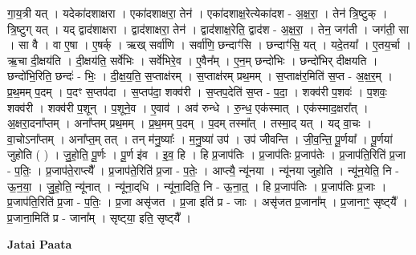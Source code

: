 \documentclass[17pt]{extarticle}
\begin{document}
गा॒य॒त्री यत् । यदेका॑दशाक्षरा । एका॑दशाक्षरा॒ तेन॑ । एका॑दशाक्ष॒रेत्येका॑दश - अ॒क्ष॒रा॒ । तेन॑ त्रि॒ष्टुक् । त्रि॒ष्टुग् यत् । यद् द्वाद॑शाक्षरा । द्वाद॑शाक्षरा॒ तेन॑ । द्वाद॑शाक्ष॒रेति॒ द्वाद॑श - अ॒क्ष॒रा॒ । तेन॒ जग॑ती । जग॑ती॒ सा । सा वै । वा ए॒षा । ए॒षर्क् । ऋख् सर्वा॑णि । सर्वा॑णि॒ छन्दाꣳ॑सि । छन्दाꣳ॑सि॒ यत् । यदे॒तया᳚ । ए॒तय॒र्चा । ऋ॒चा दी॒क्षय॑ति । दी॒क्षय॑ति॒ सर्वे॑भिः । सर्वे॑भिरे॒व । ए॒वैन᳚म् । ए॒न॒म् छन्दो॑भिः । छन्दो॑भिर् दीक्षयति । छन्दो॑भि॒रिति॒ छन्दः॑ - भिः॒ । दी॒क्ष॒य॒ति॒ स॒प्ताक्ष॑रम् । स॒प्ताक्ष॑रम् प्रथ॒मम् । स॒प्ताक्ष॑र॒मिति॑ स॒प्त - अ॒क्ष॒र॒म् । प्र॒थ॒मम् प॒दम् । प॒दꣳ स॒प्तप॑दा । स॒प्तप॑दा॒ शक्व॑री । स॒प्तप॒देति॑ स॒प्त - प॒दा॒ । शक्व॑री प॒शवः॑ । प॒शवः॒ शक्व॑री । शक्व॑री प॒शून् । प॒शूने॒व । ए॒वाव॑ । अव॑ रुन्धे । रु॒न्ध॒ एक॑स्मात् । एक॑स्माद॒क्षरा᳚त् । अ॒क्षरा॒दना᳚प्तम् । अना᳚प्तम् प्रथ॒मम् । प्र॒थ॒मम् प॒दम् । प॒दम् तस्मा᳚त् । तस्मा॒द् यत् । यद् वा॒चः । वा॒चोऽना᳚प्तम् । अना᳚प्त॒म् तत् । तन् म॑नु॒ष्याः᳚ । म॒नु॒ष्या॑ उप॑ । उप॑ जीवन्ति । जी॒व॒न्ति॒ पू॒र्णया᳚ । पू॒र्णया॑ जुहोति ( ) । जु॒हो॒ति॒ पू॒र्णः । पू॒र्ण इ॑व । इ॒व॒ हि । हि प्र॒जाप॑तिः । प्र॒जाप॑तिः प्र॒जाप॑तेः । प्र॒जाप॑ति॒रिति॑ प्र॒जा - प॒तिः॒ । प्र॒जाप॑ते॒राप्त्यै᳚ । प्र॒जाप॑ते॒रिति॑ प्र॒जा - प॒तेः॒ । आप्त्यै॒ न्यू॑नया । न्यू॑नया जुहोति । न्यू॑न॒येति॒ नि - ऊ॒न॒या॒ । जु॒हो॒ति॒ न्यू॑नात् । न्यू॑ना॒द्‌धि । न्यू॑ना॒दिति॒ नि - ऊ॒ना॒त्॒ । हि प्र॒जाप॑तिः । प्र॒जाप॑तिः प्र॒जाः । प्र॒जाप॑ति॒रिति॑ प्र॒जा - प॒तिः॒ । प्र॒जा असृ॑जत । प्र॒जा इति॑ प्र - जाः । असृ॑जत प्र॒जाना᳚म् । प्र॒जानाꣳ॒॒ सृष्ट्‍यै᳚ । प्र॒जाना॒मिति॑ प्र - जाना᳚म् । सृष्ट्‍या॒ इति॒ सृष्ट्‍यै᳚ । \newline

\textbf{Jatai Paata} \newline
\end{document}
